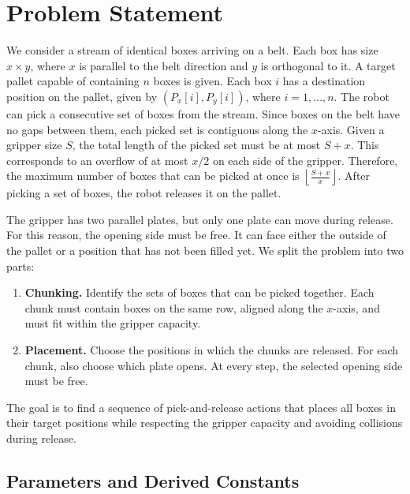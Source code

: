 \section{Problem Statement}

We consider a stream of identical boxes arriving on a belt.
Each box has size \(x \times y\), where \(x\) is parallel to the
belt direction and \(y\) is orthogonal to it. 
A target pallet capable of containing \(n\) boxes is given.
Each box \(i\) has a destination position on the pallet, given by 
$(P_x[i], P_y[i])$, where $i = 1,\ldots,n$. 
The robot can pick a consecutive set of boxes from the stream. Since boxes
on the belt have no gaps between them, each picked set is contiguous
along the \(x\)-axis. Given a gripper size \(S\), the total length of the
picked set must be at most \(S+x\). This corresponds to an overflow of at
most \(x/2\) on each side of the gripper. Therefore, the maximum number
of boxes that can be picked at once is $\left\lfloor \frac{S+x}{x} \right\rfloor$.
After picking a set of boxes, the robot releases it on the pallet.

The gripper has two parallel plates, but only one plate can move during
release. For this reason, the opening side must be free. It can face either
the outside of the pallet or a position that has not been filled yet.
We split the problem into two parts:
\begin{enumerate}
    \item \textbf{Chunking.} Identify the sets of boxes that can be picked
    together. Each chunk must contain boxes on the same row, aligned along
    the \(x\)-axis, and must fit within the gripper capacity.

    \item \textbf{Placement.} Choose the positions in which the chunks are
    released. For each chunk, also choose which plate opens. At every step,
    the selected opening side must be free.
\end{enumerate}
The goal is to find a sequence of pick-and-release actions that places all
boxes in their target positions while respecting the gripper capacity
and avoiding collisions during release.

\subsection{Parameters and Derived Constants}

